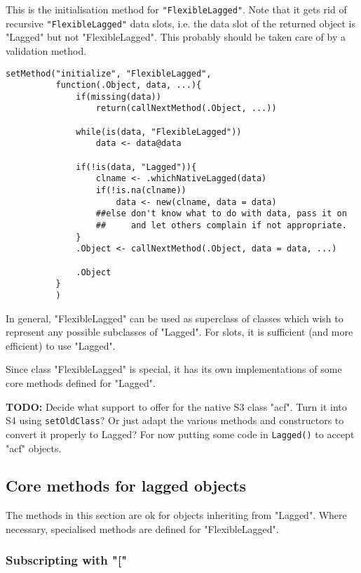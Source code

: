 \documentclass[11pt,a4paper]{article}
\begin{document}
This is the initialisation method for \texttt{"FlexibleLagged"}. Note that it gets rid of recursive
\texttt{"FlexibleLagged"} data slots, i.e. the data slot of the returned object is "Lagged" but not
"FlexibleLagged".  This probably should be taken care of by a validation method.
\begin{verbatim}
setMethod("initialize", "FlexibleLagged",
          function(.Object, data, ...){
              if(missing(data))
                  return(callNextMethod(.Object, ...))

              while(is(data, "FlexibleLagged"))
                  data <- data@data

              if(!is(data, "Lagged")){
                  clname <- .whichNativeLagged(data)
                  if(!is.na(clname))
                      data <- new(clname, data = data)
                  ##else don't know what to do with data, pass it on
                  ##     and let others complain if not appropriate.
              }
              .Object <- callNextMethod(.Object, data = data, ...)

              .Object
          }
          )
\end{verbatim}
In general, "FlexibleLagged" can be used as superclass of classes which wish to represent any
possible subclasses of "Lagged". For slots, it is sufficient (and more efficient) to use
"Lagged".

Since class "FlexibleLagged" is special, it has its own implementations of some core methods
defined for "Lagged".

\textbf{TODO:} Decide what support to offer for the native S3 class "acf". Turn it into S4 using
\texttt{setOldClass}? Or just adapt the various methods and constructors to convert it properly to
Lagged? For now putting some code in \texttt{Lagged()} to accept "acf" objects.

\subsection{Core methods for lagged objects}
\label{sec:org6d089da}

The methods in this section are ok for objects inheriting from "Lagged". Where
necessary, specialised methods are defined for "FlexibleLagged".


\subsubsection{Subscripting with "["}
\label{sec:org18c9cac}
\end{document}
